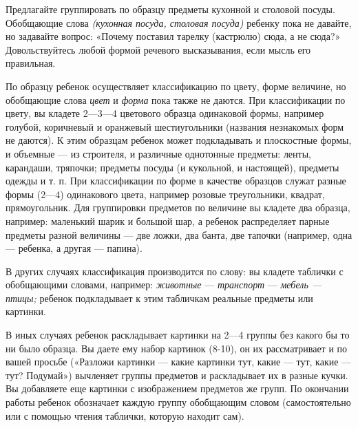 \documentclass[a5paper]{book}
\renewcommand{\emph}[1]{\textit{#1}}
\begin{document}
Предлагайте группировать по образцу предметы кухонной и столовой посуды.
Обобщающие слова \emph{(кухонная посуда, столовая посуда)} ребенку пока
не давайте, но задавайте вопрос: «Почему поставил тарелку (кастрюлю)
сюда, а не сюда?» Довольствуйтесь любой формой речевого высказывания,
если мысль его правильная.

По образцу ребенок осуществляет классификацию по цвету, форме величине,
но обобщающие слова \emph{цвет} и \emph{форма} пока также не даются. При
классификации по цвету, вы кладете 2---3---4 цветового образца
одинаковой формы, например голубой, коричневый и оранжевый
шестиугольники (названия незнакомых форм не даются). К этим образцам
ребенок может подкладывать и плоскостные формы, и объемные --- из
строителя, и различные однотонные предметы: ленты, карандаши, тряпочки;
предметы посуды (и кукольной, и настоящей), предметы одежды и т. п. При
классификации по форме в качестве образцов служат разные формы (2---4)
одинакового цвета, например розовые треугольники, квадрат,
прямоугольник. Для группировки предметов по величине вы кладете два
образца, например: маленький шарик и большой шар, а ребенок распределяет
парные предметы разной величины --- две ложки, два банта, две тапочки
(например, одна --- ребенка, а другая --- папина).

В других случаях классификация производится по слову: вы кладете
таблички с обобщающими словами, например: \emph{животные} ---
\emph{транспорт} --- \emph{мебель --- птицы;} ребенок подкладывает к
этим табличкам реальные предметы или картинки.

В иных случаях ребенок раскладывает картинки на 2---4 группы без какого
бы то ни было образца. Вы даете ему набор картинок (8-10), он их
рассматривает и по вашей просьбе («Разложи картинки --- какие картинки
тут, какие --- тут, какие --- тут? Подумай») вычленяет группы предметов
и раскладывает их в разные кучки. Вы добавляете еще картинки с
изображением предметов же групп. По окончании работы ребенок обозначает
каждую группу обобщающим словом (самостоятельно или с помощью чтения
таблички, которую находит сам).
\end{document}
